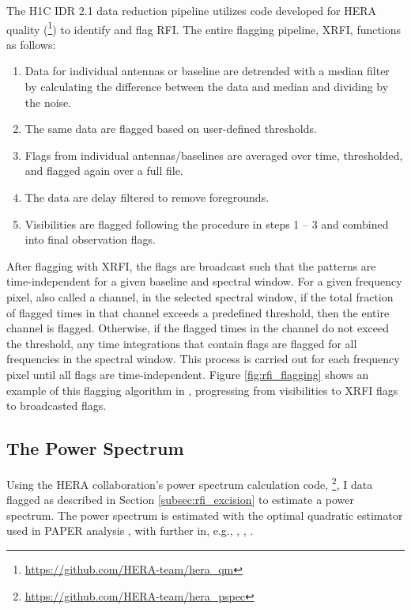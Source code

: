 \documentclass[12pt]{article}
\begin{document}
The H1C IDR 2.1 data reduction pipeline utilizes code developed for HERA quality  (\heraqm\footnote{\url{https://github.com/HERA-team/hera_qm}}) to identify and flag RFI. The entire flagging pipeline, XRFI, functions as follows:

\begin{enumerate}
	\item Data for individual antennas or baseline are detrended with a median filter by calculating the difference between the data and median and dividing by the noise.
	\item The same data are flagged based on user-defined thresholds.
	\item Flags from individual antennas/baselines are averaged over time, thresholded, and flagged again over a full file.
	\item The data are delay filtered to remove foregrounds. 
	\item Visibilities are flagged following the procedure in steps 1 -- 3 and combined into final observation flags.
\end{enumerate}

After flagging with XRFI, the flags are broadcast such that the patterns are time-independent for a given baseline and spectral window. For a given frequency pixel, also called a channel, in the selected spectral window, if the total fraction of flagged times in that channel exceeds a predefined threshold, then the entire channel is flagged. Otherwise, if the flagged times in the channel do not exceed the threshold, any time integrations that contain flags are flagged for all frequencies in the spectral window. This process is carried out for each frequency pixel until all flags are time-independent.  Figure \ref{fig:rfi_flagging} shows an example of this flagging algorithm in , progressing from visibilities to XRFI flags to broadcasted flags.


\subsection{The Power Spectrum} \label{subsec:calc_ps}

Using the HERA collaboration's power spectrum calculation code, \herapspec\footnote{\url{https://github.com/HERA-team/hera_pspec}}, I  data flagged as described in Section \ref{subsec:rfi_excision} to estimate a  power spectrum. The power spectrum is estimated with the optimal quadratic estimator used in PAPER analysis \citep{ali2015}, with further  in, e.g., \cite{tegmark1997}, \cite{tegmark1998}, \cite{liu2011}.
\end{document}
